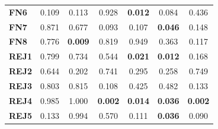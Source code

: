 \begin{table}
\begin{tabular}{lccc|ccc}
        \textbf{FN6}  & 0.109                                   & 0.113                                             & 0.928                                  & \cellcolor[HTML]{EFEFEF}\textbf{0.012}   & 0.084                                  & 0.436                                  \\
        \textbf{FN7}  & 0.871                                   & 0.677                                             & 0.093                                  & 0.107                                    & \cellcolor[HTML]{EFEFEF}\textbf{0.046} & 0.148                                  \\
        \textbf{FN8}  & 0.776                                   & \cellcolor[HTML]{EFEFEF}\textbf{0.009}            & 0.819                                  & 0.949                                    & 0.363                                  & 0.117                                  \\
        \textbf{REJ1} & 0.799                                   & 0.734                                             & 0.544                                  & \cellcolor[HTML]{EFEFEF}\textbf{0.021}   & \cellcolor[HTML]{EFEFEF}\textbf{0.012} & 0.168                                  \\
        \textbf{REJ2} & 0.644                                   & 0.202                                             & 0.741                                  & 0.295                                    & 0.258                                  & 0.749                                  \\
        \textbf{REJ3} & 0.803                                   & 0.815                                             & 0.108                                  & 0.425                                    & 0.482                                  & 0.133                                  \\
        \textbf{REJ4} & 0.985                                   & 1.000                                             & \cellcolor[HTML]{EFEFEF}\textbf{0.002} & \cellcolor[HTML]{EFEFEF}\textbf{0.014}   & \cellcolor[HTML]{EFEFEF}\textbf{0.036} & \cellcolor[HTML]{EFEFEF}\textbf{0.002} \\
        \textbf{REJ5} & 0.133                                   & 0.994                                             & 0.570                                  & 0.111                                    & \cellcolor[HTML]{EFEFEF}\textbf{0.036} & 0.090                                  \\

\end{tabular}
\end{table}
